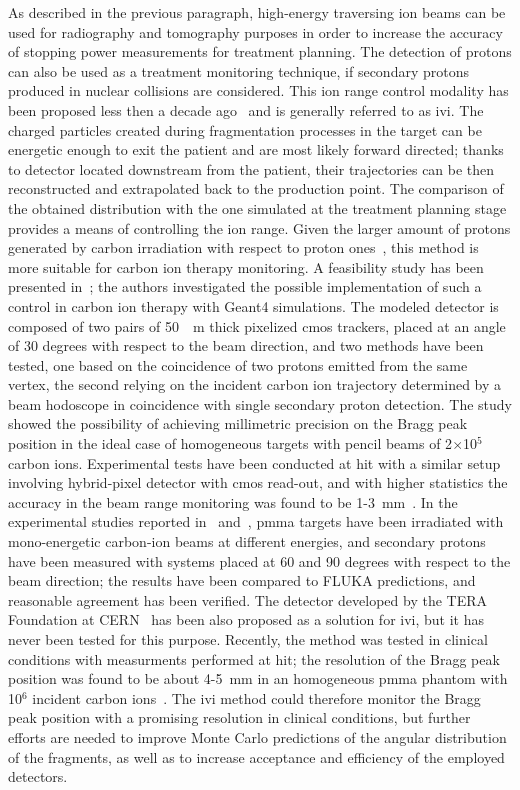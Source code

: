 As described in the previous paragraph, high-energy traversing ion beams can be used for radiography and tomography purposes in order to increase the accuracy of stopping power measurements for treatment planning. The detection of protons can also be used as a treatment monitoring technique, if secondary protons produced in nuclear collisions are considered. This ion range control modality has been proposed less then a decade ago~\parencite{Dauvergne2009, Amaldi2010b} and is generally referred to as \gls{ivi}. The charged particles created during fragmentation processes in the target can be energetic enough to exit the patient and are most likely forward directed; thanks to detector located downstream from the patient, their trajectories can be then reconstructed and extrapolated back to the production point. The comparison of the obtained distribution with the one simulated at the treatment planning stage provides a means of controlling the ion range. Given the larger amount of protons generated by carbon irradiation with respect to proton ones~\parencite{Gunzert-Marx2008}, this method is more suitable for carbon ion therapy monitoring.  
A feasibility study has been presented in~\cite{Henriquet2012}; the authors investigated the possible implementation of such a control in carbon ion therapy with Geant4 simulations. The modeled detector is composed of two pairs of 50~\charmu ~m thick pixelized \gls{cmos} trackers, placed at an angle of 30 degrees with respect to the beam direction, and two methods have been tested, one based on the coincidence of two protons emitted from the same vertex, the second relying on the incident carbon ion trajectory determined by a beam hodoscope in coincidence with single secondary proton detection. The study showed the possibility of achieving millimetric precision on the Bragg peak position in the ideal case of homogeneous targets with pencil beams of 2$\times$10$^5$ carbon ions. Experimental tests have been conducted at \gls{hit} with a similar setup involving hybrid-pixel detector with \gls{cmos} read-out, and with higher statistics the accuracy in the beam range monitoring was found to be 1-3~mm~\parencite{Gwosch2013}. In the experimental studies reported in~\cite{Agodi2012} and~\cite{Piersanti2014}, \gls{pmma} targets have been irradiated with mono-energetic carbon-ion beams at different energies, and secondary protons have been measured with systems placed at 60 and 90 degrees with respect to the beam direction; the results have been compared to FLUKA predictions, and reasonable agreement has been verified. The detector developed by the TERA Foundation at CERN~\parencite{BucciantonioPhD2015} has been also proposed as a solution for \gls{ivi}, but it has never been tested for this purpose. Recently, the method was tested in clinical conditions with measurments performed at \gls{hit}; the resolution of the Bragg peak position was found to be about 4-5~mm in an homogeneous \gls{pmma} phantom with 10$^6$ incident carbon ions~\parencite{Finck2017}.
The \gls{ivi} method could therefore monitor the Bragg peak position with a promising resolution in clinical conditions, but further efforts are needed to improve Monte Carlo predictions of the angular distribution of the fragments, as well as to increase acceptance and efficiency of the employed detectors. 
    
